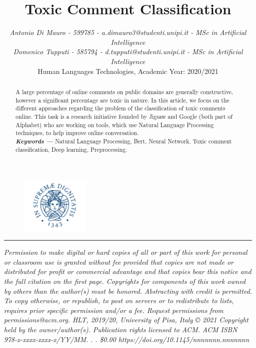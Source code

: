 \documentclass[10.5pt]{article}
\title{\vspace{-2cm}\textbf{Toxic Comment Classification}}
\author{\small{\textit{Antonio Di Mauro  - 599785 - a.dimauro3@studenti.unipi.it - MSc in Artificial Intelligence}} \\ 
        \small{\textit{Domenico Tupputi - 585794 - d.tupputi@studenti.unipi.it - MSc in Artificial Intelligence}} \\ 
        \small{Human Languages Technologies, Academic Year: 2020/2021}}
\providecommand{\keywords}[1]
{
  \small	
  \textbf{\textit{Keywords --- }} #1
}
\begin{document}

\begin{figure}
\centering
\includegraphics[width=0.3\textwidth]{uni.png}
\end{figure}
\maketitle

\begin{multicols*}{2}

\begin{abstract}
A large percentage of online comments on public domains are generally constructive, however a significant percentage are toxic in nature. In this article, we focus on the different approaches regarding the problem of the classification of toxic comments online.
This task is a research initiative founded by Jigsaw and Google (both part of Alphabet) who are working on tools, which use Natural Language Processing techniques, to help improve online conversation. \vspace{0.1cm} \\
\keywords{Natural Language Processing, Bert, Neural Network, Toxic comment classification, Deep learning, Preprocessing. }
\end{abstract}

\vspace{5pt}
\hrule
\vspace{6pt}
\begingroup
  \small
\textit{Permission to make digital or hard copies of all or part of this work for
personal or classroom use is granted without fee provided that copies
are not made or distributed for profit or commercial advantage and that
copies bear this notice and the full citation on the first page. Copyrights
for components of this work owned by others than the author(s) must
be honored. Abstracting with credit is permitted. To copy otherwise, or
republish, to post on servers or to redistribute to lists, requires prior specific
permission and/or a fee. Request permissions from permissions@acm.org.
HLT, 2019/20, University of Pisa, Italy
© 2021 Copyright held by the owner/author(s). Publication rights licensed
to ACM.
ACM ISBN 978-x-xxxx-xxxx-x/YY/MM. . . \$0.00
https://doi.org/10.1145/nnnnnnn.nnnnnnn}
\endgroup


\end{multicols*}
\end{document}
